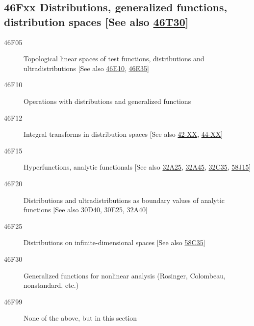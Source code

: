 \documentclass[letterpaper]{article}
\begin{document}
\subsection*{46Fxx  Distributions, generalized functions, distribution spaces [See also \hyperref[46T30]{46T30}] }\label{46Fxx}
\begin{description}  
\item [46F05]\label{46F05} Topological linear spaces of test functions, distributions and ultradistributions [See also \hyperref[46E10]{46E10}, \hyperref[46E35]{46E35}]
\item [46F10]\label{46F10} Operations with distributions and generalized functions
\item [46F12]\label{46F12} Integral transforms in distribution spaces [See also \hyperref[42-XX]{42-XX}, \hyperref[44-XX]{44-XX}]
\item [46F15]\label{46F15} Hyperfunctions, analytic functionals [See also \hyperref[32A25]{32A25}, \hyperref[32A45]{32A45}, \hyperref[32C35]{32C35}, \hyperref[58J15]{58J15}]
\item [46F20]\label{46F20} Distributions and ultradistributions as boundary values of analytic functions [See also \hyperref[30D40]{30D40}, \hyperref[30E25]{30E25}, \hyperref[32A40]{32A40}]
\item [46F25]\label{46F25} Distributions on infinite-dimensional spaces [See also \hyperref[58C35]{58C35}]
\item [46F30]\label{46F30} Generalized functions for nonlinear analysis (Rosinger, Colombeau, nonstandard, etc.)
\item [46F99]\label{46F99} None of the above, but in this section
\end{description}
\end{document}
